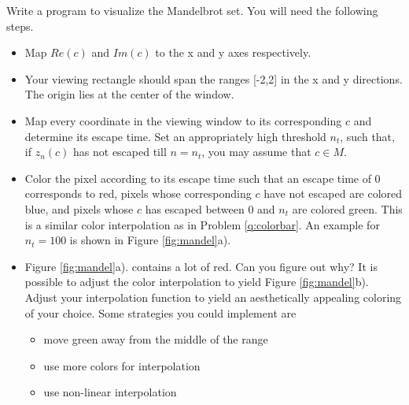 \documentclass[addpoints]{exam}
\begin{document}
\begin{questions}
Write a program to visualize the Mandelbrot set. You will need the following steps.
\begin{itemize}
\item Map $Re(c)$ and $Im(c)$ to the x and y axes respectively.
\item Your viewing rectangle should span the ranges [-2,2] in the x and y directions. The origin lies at the center of the window.
\item Map every coordinate in the viewing window to its corresponding $c$ and determine its escape time. Set an appropriately high threshold $n_t$, such that, if $z_n(c)$ has not escaped till $n = n_t$, you may assume that $c \in M$.
\item Color the pixel according to its escape time such that an escape time of 0 corresponds to red, pixels whose corresponding $c$ have not escaped are colored blue, and pixels whose $c$ has escaped between 0 and $n_t$ are colored green. This is a similar color interpolation as in Problem \ref{q:colorbar}. An example for $n_t=100$ is shown in Figure \ref{fig:mandel}a).
\item Figure \ref{fig:mandel}a). contains a lot of red. Can you figure out why? It is possible to adjust the color interpolation to yield Figure \ref{fig:mandel}b). Adjust your interpolation function to yield an aesthetically appealing coloring of your choice. Some strategies you could implement are
  \begin{itemize}
  \item move green away from the middle of the range
  \item use more colors for interpolation
  \item use non-linear interpolation
  \end{itemize}
\end{itemize}
\end{questions}
\end{document}

